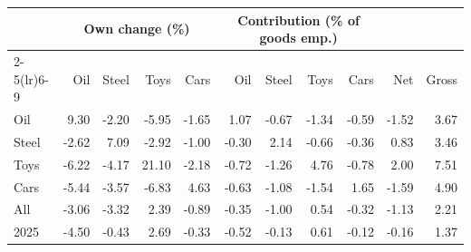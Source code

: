 \begin{tabular}{lrrrrrrrrrr}
\toprule
 & \multicolumn{4}{c}{Own change (\%)} & \multicolumn{4}{c}{Contribution (\% of goods emp.)} & & \\
\cmidrule(lr){2-5}\cmidrule(lr){6-9}
 & Oil & Steel & Toys & Cars & Oil & Steel & Toys & Cars & Net & Gross \\
\midrule
Oil & 9.30 & -2.20 & -5.95 & -1.65 & 1.07 & -0.67 & -1.34 & -0.59 & -1.52 & 3.67 \\
Steel & -2.62 & 7.09 & -2.92 & -1.00 & -0.30 & 2.14 & -0.66 & -0.36 & 0.83 & 3.46 \\
Toys & -6.22 & -4.17 & 21.10 & -2.18 & -0.72 & -1.26 & 4.76 & -0.78 & 2.00 & 7.51 \\
Cars & -5.44 & -3.57 & -6.83 & 4.63 & -0.63 & -1.08 & -1.54 & 1.65 & -1.59 & 4.90 \\
All & -3.06 & -3.32 & 2.39 & -0.89 & -0.35 & -1.00 & 0.54 & -0.32 & -1.13 & 2.21 \\
2025 & -4.50 & -0.43 & 2.69 & -0.33 & -0.52 & -0.13 & 0.61 & -0.12 & -0.16 & 1.37 \\
\bottomrule
\end{tabular}
